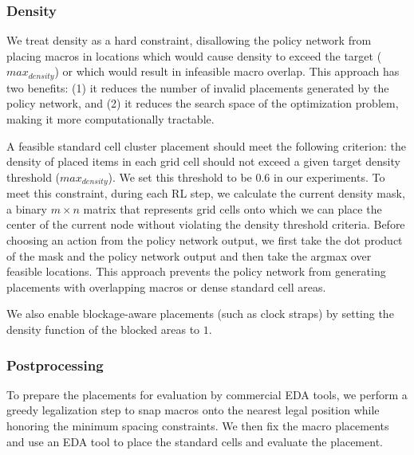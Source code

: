 \documentclass{article}
\begin{document}
\subsubsection{Density}
\label{section:density}
We treat density as a hard constraint, disallowing the policy network from placing macros in locations which would cause density to exceed the target ($max_{density}$) or which would result in infeasible macro overlap. This approach has two benefits: (1) it reduces the number of invalid placements generated by the policy network, and (2) it reduces the search space of the optimization problem, making it more computationally tractable.

A feasible standard cell cluster placement should meet the following criterion: the density of placed items in each grid cell should not exceed a given target density threshold ($max_{density}$). We set this threshold to be $0.6$ in our experiments. To meet this constraint, during each RL step, we calculate the current density mask, a binary $m\times n$ matrix that represents grid cells onto which we can place the center of the current node without violating the density threshold criteria. Before choosing an action from the policy network output, we first take the dot product of the mask and the policy network output and then take the argmax over feasible locations. This approach prevents the policy network from generating placements with overlapping macros or dense standard cell areas.

We also enable blockage-aware placements (such as clock straps) by setting the density function of the blocked areas to $1$.

\subsubsection{Postprocessing}
\label{section:postprocessing}
To prepare the placements for evaluation by commercial EDA tools, we perform a greedy legalization step to snap macros onto the nearest legal position while honoring the minimum spacing constraints. We then fix the macro placements and use an EDA tool to place the standard cells and evaluate the placement.  

\end{document}
